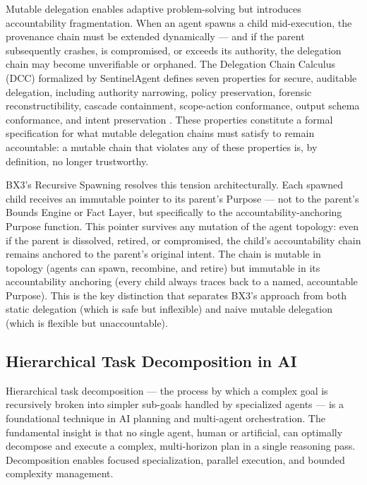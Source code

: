 Mutable delegation enables adaptive problem-solving but introduces accountability fragmentation. When an agent spawns a child mid-execution, the provenance chain must be extended dynamically — and if the parent subsequently crashes, is compromised, or exceeds its authority, the delegation chain may become unverifiable or orphaned. The Delegation Chain Calculus (DCC) formalized by SentinelAgent defines seven properties for secure, auditable delegation, including authority narrowing, policy preservation, forensic reconstructibility, cascade containment, scope-action conformance, output schema conformance, and intent preservation \cite{sentinelagent2026}. These properties constitute a formal specification for what mutable delegation chains must satisfy to remain accountable: a mutable chain that violates any of these properties is, by definition, no longer trustworthy.

BX3's Recursive Spawning resolves this tension architecturally. Each spawned child receives an immutable pointer to its parent's Purpose — not to the parent's Bounds Engine or Fact Layer, but specifically to the accountability-anchoring Purpose function. This pointer survives any mutation of the agent topology: even if the parent is dissolved, retired, or compromised, the child's accountability chain remains anchored to the parent's original intent. The chain is mutable in topology (agents can spawn, recombine, and retire) but immutable in its accountability anchoring (every child always traces back to a named, accountable Purpose). This is the key distinction that separates BX3's approach from both static delegation (which is safe but inflexible) and naive mutable delegation (which is flexible but unaccountable).

\subsection{Hierarchical Task Decomposition in AI}

Hierarchical task decomposition — the process by which a complex goal is recursively broken into simpler sub-goals handled by specialized agents — is a foundational technique in AI planning and multi-agent orchestration. The fundamental insight is that no single agent, human or artificial, can optimally decompose and execute a complex, multi-horizon plan in a single reasoning pass. Decomposition enables focused specialization, parallel execution, and bounded complexity management.

